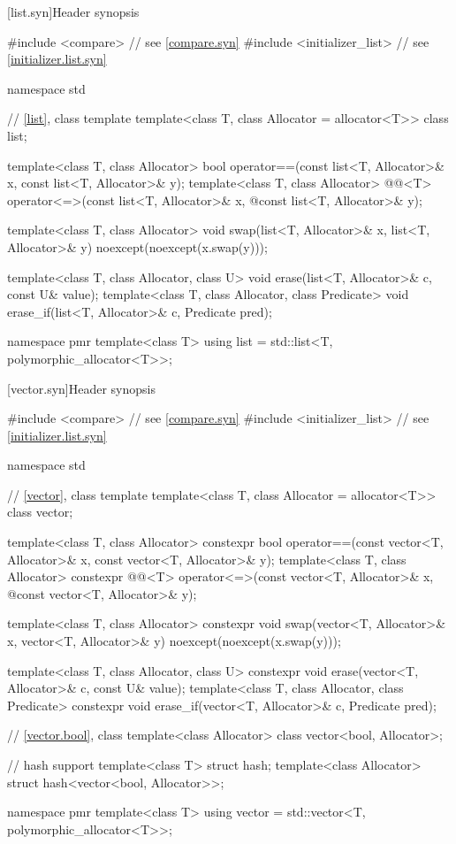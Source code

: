 [list.syn]{Header  synopsis}

%
\begin{codeblock}
#include <compare>              // see \ref{compare.syn}
#include <initializer_list>     // see \ref{initializer.list.syn}

namespace std {
  // \ref{list}, class template 
  template<class T, class Allocator = allocator<T>> class list;

  template<class T, class Allocator>
    bool operator==(const list<T, Allocator>& x, const list<T, Allocator>& y);
  template<class T, class Allocator>
    @@<T> operator<=>(const list<T, Allocator>& x,
    @\itcorr@                                      const list<T, Allocator>& y);

  template<class T, class Allocator>
    void swap(list<T, Allocator>& x, list<T, Allocator>& y)
      noexcept(noexcept(x.swap(y)));

  template<class T, class Allocator, class U>
    void erase(list<T, Allocator>& c, const U& value);
  template<class T, class Allocator, class Predicate>
    void erase_if(list<T, Allocator>& c, Predicate pred);

  namespace pmr {
    template<class T>
      using list = std::list<T, polymorphic_allocator<T>>;
  }
}
\end{codeblock}

[vector.syn]{Header  synopsis}

%
\begin{codeblock}
#include <compare>              // see \ref{compare.syn}
#include <initializer_list>     // see \ref{initializer.list.syn}

namespace std {
  // \ref{vector}, class template 
  template<class T, class Allocator = allocator<T>> class vector;

  template<class T, class Allocator>
    constexpr bool operator==(const vector<T, Allocator>& x, const vector<T, Allocator>& y);
  template<class T, class Allocator>
    constexpr @@<T> operator<=>(const vector<T, Allocator>& x,
              @\itcorr@                                      const vector<T, Allocator>& y);

  template<class T, class Allocator>
    constexpr void swap(vector<T, Allocator>& x, vector<T, Allocator>& y)
      noexcept(noexcept(x.swap(y)));

  template<class T, class Allocator, class U>
    constexpr void erase(vector<T, Allocator>& c, const U& value);
  template<class T, class Allocator, class Predicate>
    constexpr void erase_if(vector<T, Allocator>& c, Predicate pred);

  // \ref{vector.bool}, class 
  template<class Allocator> class vector<bool, Allocator>;

  // hash support
  template<class T> struct hash;
  template<class Allocator> struct hash<vector<bool, Allocator>>;

  namespace pmr {
    template<class T>
      using vector = std::vector<T, polymorphic_allocator<T>>;
  }
}
\end{codeblock}

